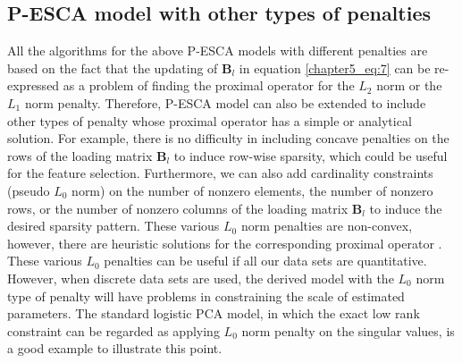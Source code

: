 \subsection{P-ESCA model with other types of penalties}
All the algorithms for the above P-ESCA models with different penalties are based on the fact that the updating of $\mathbf{B}_l$ in equation \ref{chapter5_eq:7} can be re-expressed as a problem of finding the proximal operator for the $L_2$ norm or the $L_1$ norm penalty. Therefore, P-ESCA model can also be extended to include other types of penalty whose proximal operator has a simple or analytical solution. For example, there is no difficulty in including concave penalties on the rows of the loading matrix $\mathbf{B}_l$ to induce row-wise sparsity, which could be useful for the feature selection. Furthermore, we can also add cardinality constraints (pseudo $L_{0}$ norm) on the number of nonzero elements, the number of nonzero rows, or the number of nonzero columns of the loading matrix $\mathbf{B}_l$ to induce the desired sparsity pattern. These various $L_0$ norm penalties are non-convex, however, there are heuristic solutions for the corresponding proximal operator \cite{boyd2011distributed}. These various $L_0$ penalties can be useful if all our data sets are quantitative. However, when discrete data sets are used, the derived model with the $L_0$ norm type of penalty will have problems in constraining the scale of estimated parameters. The standard logistic PCA model, in which the exact low rank constraint can be regarded as applying $L_0$ norm penalty on the singular values, is a good example to illustrate this point.

